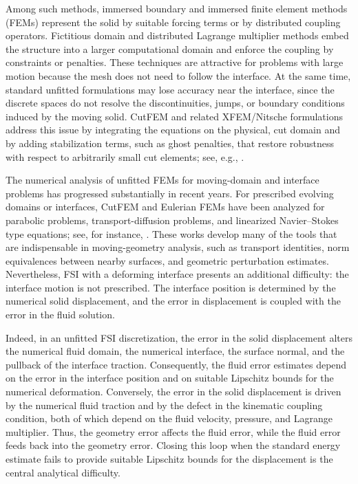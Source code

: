 \documentclass[11pt,reqno]{amsart}
\theoremstyle{definition}
\theoremstyle{plain}
\numberwithin{theorem}{section}
\numberwithin{proposition}{section}
\numberwithin{lemma}{section}
\numberwithin{equation}{section}
\renewcommand{\(}{\bigl(}
\renewcommand{\)}{\bigr)}
\begin{document}
Among such methods, immersed boundary and immersed finite element methods (FEMs) 
\cite{peskin2002,Zhang2004,Mittal2005,boffi-cavallini-gastaldi-11,wang2013modified}
represent the solid by suitable forcing terms or by distributed coupling operators. Fictitious
domain and distributed Lagrange multiplier methods
\cite{GlowinskiDistributedLagrange,Baaijens,DEHART2003103,dossantos2008,cottet-et-al-08,astorino2009,richter-13,boffi2015finite,kamensky2015immersogeometric,BoffiGastaldi,BOILEVINKAYL2019744}
embed the structure into a larger computational domain and enforce the coupling by
constraints or penalties. These techniques are attractive for problems with large motion
because the mesh does not need to follow the interface. At the same time, standard
unfitted formulations may lose accuracy near the interface, since the discrete spaces do
not resolve the discontinuities, jumps, or boundary conditions induced by the moving
solid. CutFEM and related XFEM/Nitsche formulations address this
issue by integrating the equations on the physical, cut domain and by adding stabilization
terms, such as ghost penalties, that restore robustness with respect to arbitrarily small
cut elements; see, e.g.,
\cite{hansbo-hansbo-02,hansbo-hansbo-04,zilian-legay-08,MayerGerstenbergerWall2009,MayerPoppGerstenbergerWall2010,sawada-tezuka-11,burman-hansbo-12,burman-hansbo-14,burman-et-al-14,massing-et-al-14,burman-fernandez-14,alauzet-et-al-15,zonca2018unfitted,ager-et-al-19,GuzmOlsh}.

The numerical analysis of unfitted FEMs for moving-domain and
interface problems has progressed substantially in recent years. For prescribed evolving
domains or interfaces, CutFEM and Eulerian FEMs have been analyzed
for parabolic problems, transport-diffusion problems, and linearized Navier--Stokes type
equations; see, for instance,
\cite{zunino-13,lehrenfeld2019eulerian,NeilanOlsh}. These works
develop many of the tools that are indispensable in moving-geometry analysis, such as
transport identities, norm equivalences between nearby surfaces, and geometric
perturbation estimates. Nevertheless, FSI with a deforming interface presents an additional
difficulty: the interface motion is not prescribed. The interface position is determined by the numerical
solid displacement, and the error in displacement is coupled  with the error in the fluid
solution.

Indeed, in an unfitted FSI discretization, the error in the solid displacement alters the numerical fluid domain, the numerical interface, the surface normal, and the pullback of the interface traction. Consequently, the fluid error estimates depend on the error in the interface position and on suitable Lipschitz bounds for the numerical deformation. Conversely, the error in the solid displacement is driven by the numerical fluid traction and by the defect in the kinematic coupling condition, both of which depend on the fluid velocity, pressure, and Lagrange multiplier. Thus, the geometry error affects the fluid error, while the fluid error feeds back into the geometry error. Closing this loop when the standard energy estimate fails to provide suitable Lipschitz bounds for the displacement is the central analytical difficulty.
\end{document}
